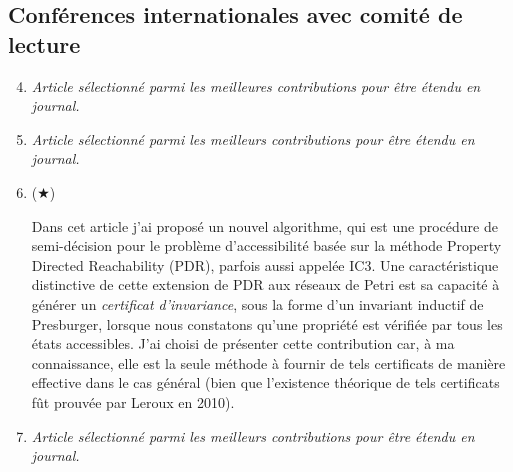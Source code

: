 \subsection{Conférences internationales avec comité de lecture}
\vspace{10pt}
\begin{enumerate}
  \setcounter{enumi}{3}
  \item  \cite{amat_combination_2021} 
  \smallbreak
  \emph{Article sélectionné parmi les meilleures contributions pour être étendu en journal.}
  \smallbreak
  \item \cite{amat_accelerating_2021} 
  \smallbreak
  \emph{Article sélectionné parmi les meilleurs contributions pour être étendu en journal.}
  \smallbreak
  \item ($\bigstar$) \cite{amat_property_2022} 
  \begin{mdframed}
    Dans cet article j'ai proposé un nouvel algorithme, qui est une procédure de
  semi-décision pour le problème d'accessibilité basée sur la méthode Property
  Directed Reachability (PDR), parfois aussi appelée IC3. Une caractéristique
  distinctive de cette extension de PDR aux réseaux de Petri est sa capacité à
  générer un \emph{certificat d'invariance}, sous la forme d'un invariant
  inductif de Presburger, lorsque nous constatons qu'une propriété est vérifiée
  par tous les états accessibles. J'ai choisi de présenter cette contribution
  car, à ma connaissance, elle est la seule méthode à fournir de tels
  certificats de manière effective dans le cas général (bien que l'existence
  théorique de tels certificats fût prouvée par Leroux en 2010).
  \end{mdframed}
  \smallbreak
  \item \cite{amat_kong_2022} 
  \smallbreak
  \emph{Article sélectionné parmi les meilleurs contributions pour être étendu en journal.}

\end{enumerate}
